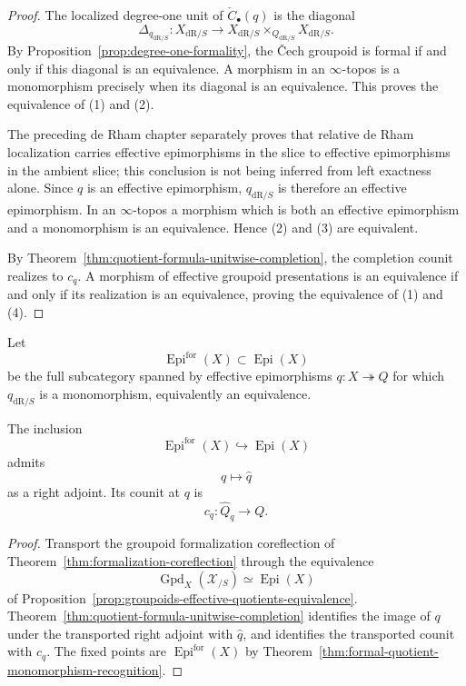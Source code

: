 \begin{proof}
The localized degree-one unit of $\check C_\bullet(q)$ is the diagonal
\[
    \Delta_{q_{\mathrm{dR}/S}}:
    X_{\mathrm{dR}/S}
    \longrightarrow
    X_{\mathrm{dR}/S}
    \times_{Q_{\mathrm{dR}/S}}
    X_{\mathrm{dR}/S}.
\]
By Proposition~\ref{prop:degree-one-formality}, the \v{C}ech groupoid is formal
if and only if this diagonal is an equivalence.  A morphism in an
$\infty$-topos is a monomorphism precisely when its diagonal is an
equivalence.  This proves the equivalence of (1) and (2).

The preceding de Rham chapter separately proves that relative de Rham
localization carries effective epimorphisms in the slice to effective
epimorphisms in the ambient slice; this conclusion is not being inferred from
left exactness alone.  Since $q$ is an effective epimorphism,
$q_{\mathrm{dR}/S}$ is therefore an effective epimorphism.  In an
$\infty$-topos a morphism which is both an effective epimorphism and a
monomorphism is an equivalence.  Hence (2) and (3) are equivalent.

By Theorem~\ref{thm:quotient-formula-unitwise-completion}, the completion
counit realizes to $c_q$.  A morphism of effective groupoid presentations is
an equivalence if and only if its realization is an equivalence, proving the
equivalence of (1) and (4).
\end{proof}

\begin{definition}
\label{def:formal-effective-quotients}
Let
\[
    \operatorname{Epi}^{\mathrm{for}}(X)
    \subset
    \operatorname{Epi}(X)
\]
be the full subcategory spanned by effective epimorphisms
$q:X\twoheadrightarrow Q$ for which
$q_{\mathrm{dR}/S}$ is a monomorphism, equivalently an equivalence.
\end{definition}

\begin{theorem}
\label{thm:quotient-formalization-coreflection}
The inclusion
\[
    \operatorname{Epi}^{\mathrm{for}}(X)
    \hookrightarrow
    \operatorname{Epi}(X)
\]
admits
\[
    q\longmapsto\widehat q
\]
as a right adjoint.  Its counit at $q$ is
\[
    c_q:\widehat Q_q\to Q.
\]
\end{theorem}

\begin{proof}
Transport the groupoid formalization coreflection
of Theorem~\ref{thm:formalization-coreflection} through the equivalence
\[
    \operatorname{Gpd}_X(\mathcal X_{/S})
    \simeq
    \operatorname{Epi}(X)
\]
of Proposition~\ref{prop:groupoids-effective-quotients-equivalence}.
Theorem~\ref{thm:quotient-formula-unitwise-completion} identifies the image
of $q$ under the transported right adjoint with $\widehat q$, and identifies
the transported counit with $c_q$.  The fixed points are
$\operatorname{Epi}^{\mathrm{for}}(X)$ by
Theorem~\ref{thm:formal-quotient-monomorphism-recognition}.
\end{proof}

